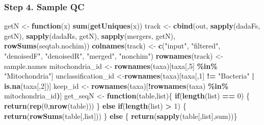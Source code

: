 \documentclass[
]{article}
\newenvironment{Shaded}{\begin{snugshade}}{\end{snugshade}}
\newcommand{\ControlFlowTok}[1]{\textcolor[rgb]{0.13,0.29,0.53}{\textbf{#1}}}
\newcommand{\DecValTok}[1]{\textcolor[rgb]{0.00,0.00,0.81}{#1}}
\newcommand{\ErrorTok}[1]{\textcolor[rgb]{0.64,0.00,0.00}{\textbf{#1}}}
\newcommand{\FunctionTok}[1]{\textcolor[rgb]{0.13,0.29,0.53}{\textbf{#1}}}
\newcommand{\NormalTok}[1]{#1}
\newcommand{\OtherTok}[1]{\textcolor[rgb]{0.56,0.35,0.01}{#1}}
\newcommand{\SpecialCharTok}[1]{\textcolor[rgb]{0.81,0.36,0.00}{\textbf{#1}}}
\newcommand{\StringTok}[1]{\textcolor[rgb]{0.31,0.60,0.02}{#1}}
\begin{document}
\hypertarget{step-4.-sample-qc}{%
\subsubsection{Step 4. Sample QC}\label{step-4.-sample-qc}}

\begin{Shaded}
\begin{Highlighting}[]
\NormalTok{getN }\OtherTok{\textless{}{-}} \ControlFlowTok{function}\NormalTok{(x) }\FunctionTok{sum}\NormalTok{(}\FunctionTok{getUniques}\NormalTok{(x))}
\NormalTok{track }\OtherTok{\textless{}{-}} \FunctionTok{cbind}\NormalTok{(out, }\FunctionTok{sapply}\NormalTok{(dadaFs, getN), }\FunctionTok{sapply}\NormalTok{(dadaRs, getN), }\FunctionTok{sapply}\NormalTok{(mergers, getN), }\FunctionTok{rowSums}\NormalTok{(seqtab.nochim))}
\FunctionTok{colnames}\NormalTok{(track) }\OtherTok{\textless{}{-}} \FunctionTok{c}\NormalTok{(}\StringTok{"input"}\NormalTok{, }\StringTok{"filtered"}\NormalTok{, }\StringTok{"denoisedF"}\NormalTok{, }\StringTok{"denoisedR"}\NormalTok{, }\StringTok{"merged"}\NormalTok{, }\StringTok{"nonchim"}\NormalTok{)}
\FunctionTok{rownames}\NormalTok{(track) }\OtherTok{\textless{}{-}}\NormalTok{ sample.names}
\NormalTok{mitochondria\_id }\OtherTok{\textless{}{-}} \FunctionTok{rownames}\NormalTok{(taxa)[taxa[,}\DecValTok{5}\NormalTok{] }\SpecialCharTok{\%in\%} \StringTok{"Mitochondria"}\NormalTok{]}
\NormalTok{unclassification\_id }\OtherTok{\textless{}{-}}\FunctionTok{rownames}\NormalTok{(taxa)[taxa[,}\DecValTok{1}\NormalTok{] }\SpecialCharTok{!=} \StringTok{"Bacteria"} \SpecialCharTok{|} \FunctionTok{is.na}\NormalTok{(taxa[,}\DecValTok{2}\NormalTok{])]}
\NormalTok{keep\_id }\OtherTok{\textless{}{-}} \FunctionTok{rownames}\NormalTok{(taxa)[}\SpecialCharTok{!}\FunctionTok{rownames}\NormalTok{(taxa) }\SpecialCharTok{\%in\%}\NormalTok{ mitochondria\_id}\ErrorTok{)}\NormalTok{]}
\NormalTok{get\_seqN }\OtherTok{\textless{}{-}} \ControlFlowTok{function}\NormalTok{(table,list)\{}
  \ControlFlowTok{if}\NormalTok{(}\FunctionTok{length}\NormalTok{(list) }\SpecialCharTok{==} \DecValTok{0}\NormalTok{) \{ }\FunctionTok{return}\NormalTok{(}\FunctionTok{rep}\NormalTok{(}\DecValTok{0}\NormalTok{,}\FunctionTok{nrow}\NormalTok{(table)))}
\NormalTok{  \} }\ControlFlowTok{else} \ControlFlowTok{if}\NormalTok{(}\FunctionTok{length}\NormalTok{(list) }\SpecialCharTok{\textgreater{}} \DecValTok{1}\NormalTok{) \{ }\FunctionTok{return}\NormalTok{(}\FunctionTok{rowSums}\NormalTok{(table[,list]))}
\NormalTok{  \} }\ControlFlowTok{else}\NormalTok{ \{ }\FunctionTok{return}\NormalTok{(}\FunctionTok{sapply}\NormalTok{(table[,list],sum))\}}

\end{Highlighting}
\end{Shaded}
\end{document}
